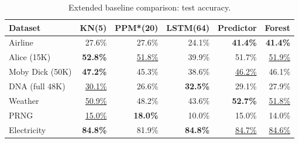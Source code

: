 \begin{table}[h]
\centering
\caption{Extended baseline comparison: test accuracy.}
\label{tab:extended}
\begin{tabular}{lrrrrr}
\toprule
Dataset & KN(5) & PPM*(20) & LSTM(64) & Predictor & Forest \\
\midrule
Airline & 27.6\% & 27.6\% & 24.1\% & \textbf{41.4\%} & \textbf{41.4\%} \\
Alice (15K) & \textbf{52.8\%} & \underline{51.8\%} & 39.9\% & 51.7\% & \underline{51.9\%} \\
Moby Dick (50K) & \textbf{47.2\%} & 45.3\% & 38.6\% & \underline{46.2\%} & 46.1\% \\
DNA (full 48K) & \underline{30.1\%} & 26.6\% & \textbf{32.5\%} & 29.1\% & 27.9\% \\
Weather & \underline{50.9\%} & 48.2\% & 43.6\% & \textbf{52.7\%} & \underline{51.8\%} \\
PRNG & \underline{15.0\%} & \textbf{18.0\%} & 10.0\% & 15.0\% & 14.0\% \\
Electricity & \textbf{84.8\%} & 81.9\% & \textbf{84.8\%} & \underline{84.7\%} & \underline{84.6\%} \\
\bottomrule
\end{tabular}
\end{table}
